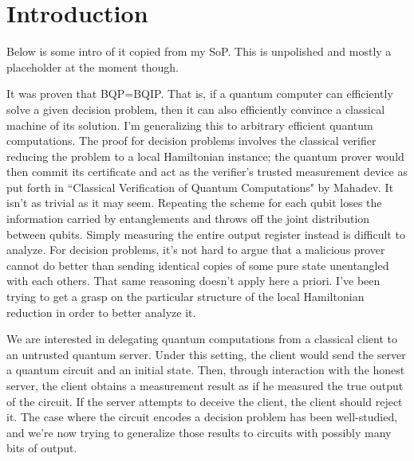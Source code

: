 \section{Introduction}



Below is some intro of it copied from my SoP.
This is unpolished and mostly a placeholder at the moment though.



It was proven that BQP=BQIP. That is, if a quantum computer can efficiently solve a given decision problem, then it can also efficiently convince a classical machine of its solution. I'm generalizing this to arbitrary efficient quantum computations. The proof for decision problems involves the classical verifier reducing the problem to a local Hamiltonian instance; the quantum prover would then commit its certificate and act as the verifier’s trusted measurement device as put forth in ``Classical Verification of Quantum Computations" by Mahadev. It isn't as trivial as it may seem. Repeating the scheme for each qubit loses the information carried by entanglements and throws off the joint distribution between qubits. Simply measuring the entire output register instead is difficult to analyze. For decision problems, it’s not hard to argue that a malicious prover cannot do better than sending identical copies of some pure state unentangled with each others. That same reasoning doesn't apply here a priori. I've been trying to get a grasp on the particular structure of the local Hamiltonian reduction in order to better analyze it.


We are interested in delegating quantum computations from a classical client to an untrusted quantum server. Under this setting, the client would send the server a quantum circuit and an initial state. Then, through interaction with the honest server, the client obtains a measurement result as if he measured the true output of the circuit. If the server attempts to deceive the client, the client should reject it. The case where the circuit encodes a decision problem has been well-studied, and we're now trying to generalize those results to circuits with possibly many bits of output.

